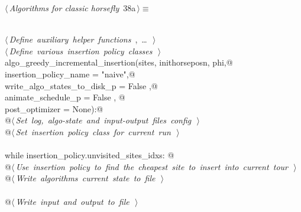 \documentclass[11.5pt]{report}
\begin{document}
\begin{flushleft} \small\label{scrap46}\raggedright\small
{} $\langle\,${\itshape Algorithms for classic horsefly}\nobreak\ {\footnotesize {38a}}$\,\rangle\equiv$
\vspace{-1ex}
\begin{list}{}{} \item
\mbox{}\verb@@\\
\mbox{}\verb@@\hbox{$\langle\,${\itshape Define auxiliary helper functions}\nobreak\ {\footnotesize {}, \ldots\ }$\,\rangle$}\verb@@\\
\mbox{}\verb@@\hbox{$\langle\,${\itshape Define various insertion policy classes}\nobreak\ {\footnotesize {}}$\,\rangle$}\verb@@\\
\mbox{}\verb@def algo_greedy_incremental_insertion(sites, inithorseposn, phi,@\\
\mbox{}\verb@                                      insertion_policy_name       = "naive",@\\
\mbox{}\verb@                                      write_algo_states_to_disk_p = False   ,@\\
\mbox{}\verb@                                      animate_schedule_p          = False   , @\\
\mbox{}\verb@                                      post_optimizer              = None):@\\
\mbox{}\verb@      @\hbox{$\langle\,${\itshape Set log, algo-state and input-output files config}\nobreak\ {\footnotesize {}}$\,\rangle$}\verb@@\\
\mbox{}\verb@      @\hbox{$\langle\,${\itshape Set insertion policy class for current run}\nobreak\ {\footnotesize {}}$\,\rangle$}\verb@@\\
\mbox{}\verb@@\\
\mbox{}\verb@      while insertion_policy.unvisited_sites_idxs: @\\
\mbox{}\verb@         @\hbox{$\langle\,${\itshape Use insertion policy to find the cheapest site to insert into current tour}\nobreak\ {\footnotesize {}}$\,\rangle$}\verb@@\\
\mbox{}\verb@         @\hbox{$\langle\,${\itshape Write algorithms current state to file}\nobreak\ {\footnotesize {}}$\,\rangle$}\verb@@\\
\mbox{}\verb@@\\
\mbox{}\verb@      @\hbox{$\langle\,${\itshape Write input and output to file}\nobreak\ {\footnotesize {}}$\,\rangle$}\verb@@\\

\end{list}
\end{flushleft}
\end{document}
